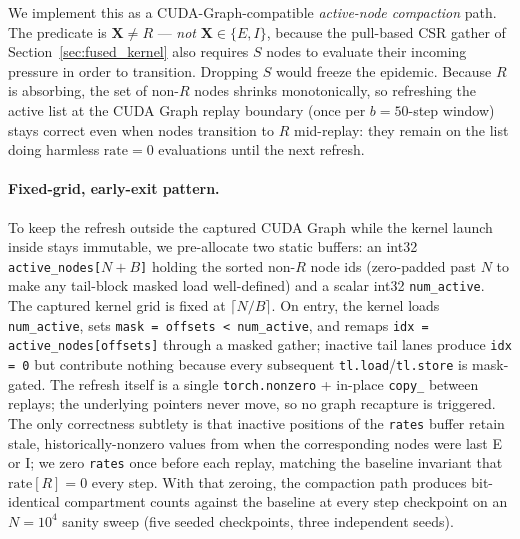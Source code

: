 We implement this as a CUDA-Graph-compatible \emph{active-node compaction} path. The predicate is $\mathbf{X} \ne R$ --- \emph{not} $\mathbf{X} \in \{E, I\}$, because the pull-based CSR gather of Section~\ref{sec:fused_kernel} also requires $S$ nodes to evaluate their incoming pressure in order to transition. Dropping $S$ would freeze the epidemic. Because $R$ is absorbing, the set of non-$R$ nodes shrinks monotonically, so refreshing the active list at the CUDA Graph replay boundary (once per $b=50$-step window) stays correct even when nodes transition to $R$ mid-replay: they remain on the list doing harmless $\mathrm{rate}=0$ evaluations until the next refresh.

\paragraph{Fixed-grid, early-exit pattern.}
To keep the refresh outside the captured CUDA Graph while the kernel launch inside stays immutable, we pre-allocate two static buffers: an int32 \texttt{active\_nodes[$N{+}B$]} holding the sorted non-$R$ node ids (zero-padded past $N$ to make any tail-block masked load well-defined) and a scalar int32 \texttt{num\_active}. The captured kernel grid is fixed at $\lceil N/B \rceil$. On entry, the kernel loads \texttt{num\_active}, sets \texttt{mask = offsets < num\_active}, and remaps \texttt{idx = active\_nodes[offsets]} through a masked gather; inactive tail lanes produce \texttt{idx = 0} but contribute nothing because every subsequent \texttt{tl.load}/\texttt{tl.store} is mask-gated. The refresh itself is a single \texttt{torch.nonzero} + in-place \texttt{copy\_} between replays; the underlying pointers never move, so no graph recapture is triggered. The only correctness subtlety is that inactive positions of the \texttt{rates} buffer retain stale, historically-nonzero values from when the corresponding nodes were last E or I; we zero \texttt{rates} once before each replay, matching the baseline invariant that $\mathrm{rate}[R] = 0$ every step. With that zeroing, the compaction path produces bit-identical compartment counts against the baseline at every step checkpoint on an $N=10^4$ sanity sweep (five seeded checkpoints, three independent seeds).

